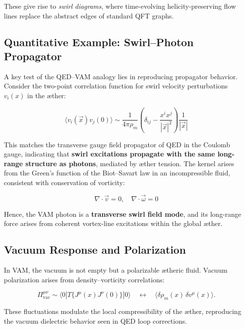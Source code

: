 These give rise to \textit{swirl diagrams}, where time-evolving helicity-preserving flow lines replace the abstract edges of standard QFT graphs.

\subsection*{Quantitative Example: Swirl–Photon Propagator}

A key test of the QED–VAM analogy lies in reproducing propagator behavior. Consider the two-point correlation function for swirl velocity perturbations \( v_i(x) \) in the æther:

\begin{equation}
\langle v_i(\vec{x}) v_j(0) \rangle
\sim \frac{1}{4\pi \rho_{\scriptscriptstyle\boldsymbol\!m}} \left( \delta_{ij} - \frac{x^i x^j}{|\vec{x}|^2} \right) \frac{1}{|\vec{x}|}
\end{equation}

This matches the transverse gauge field propagator of QED in the Coulomb gauge, indicating that \textbf{swirl excitations propagate with the same long-range structure as photons}, mediated by æther tension. The kernel arises from the Green’s function of the Biot–Savart law in an incompressible fluid, consistent with conservation of vorticity:

\[
\nabla \cdot \vec{v} = 0, \quad \nabla \cdot \vec{\omega} = 0
\]

Hence, the VAM photon is a \textbf{transverse swirl field mode}, and its long-range force arises from coherent vortex-line excitations within the global æther.

\subsection{Vacuum Response and Polarization}

In VAM, the vacuum is not empty but a polarizable ætheric fluid. Vacuum polarization arises from density–vorticity correlations:

\begin{equation}
\Pi^{\mu\nu}_{\text{vac}} \sim \langle 0 | T\{J^\mu(x) J^\nu(0)\} | 0 \rangle
\quad \leftrightarrow \quad
\langle \delta \rho_{\scriptscriptstyle\boldsymbol\!m}(x) \, \delta v^\mu(x) \rangle.
\end{equation}

These fluctuations modulate the local compressibility of the æther, reproducing the vacuum dielectric behavior seen in QED loop corrections.

